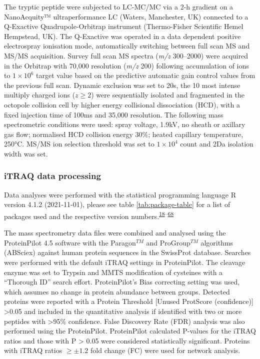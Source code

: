 \documentclass[
]{article}
\begin{document}
The tryptic peptide were subjected to LC-MC/MC via a 2-h gradient on a NanoAcquity™ ultraperformance LC (Waters, Manchester, UK) connected to a Q-Exactive Quadrupole-Orbitrap instrument (Thermo-Fisher Scientific Hemel Hempstead, UK).
The Q-Exactive was operated in a data dependent positive electrospray ionisation mode, automatically switching between full scan MS and MS/MS acquisition.
Survey full scan MS spectra (\emph{m/z} 300--2000) were acquired in the Orbitrap with 70,000 resolution (\emph{m/z} 200) following accumulation of ions to \(1\times 10^6\) target value based on the predictive automatic gain control values from the previous full scan.
Dynamic exclusion was set to 20s, the 10 most intense multiply charged ions (\(z \geq 2\)) were sequentially isolated and fragmented in the octopole collision cell by higher energy collisional dissociation (HCD), with a fixed injection time of 100ms and 35,000 resolution.
The following mass spectrometric conditions were used: spray voltage, 1.9kV, no sheath or axillary gas flow; normalised HCD collision energy 30\%; heated capillary temperature, 250°C.
MS/MS ion selection threshold was set to \(1\times 10^4\) count and 2Da isolation width was set.

\hypertarget{itraq-stats}{%
\subsubsection{iTRAQ data processing}\label{itraq-stats}}

Data analyses were performed with the statistical programming language R version 4.1.2 (2021-11-01), please see table \ref{tab:package-table} for a list of packages used and the respective version numbers.\textsuperscript{\protect\hyperlink{ref-base}{18}--\protect\hyperlink{ref-zoo}{68}}

The mass spectrometry data files were combined and analysed using the ProteinPilot 4.5 software with the Paragon\(^{TM}\) and ProGroup\(^{TM}\) algorithms (ABSciex) against human protein sequences in the SwissProt database.
Searches were performed with the default iTRAQ settings in ProteinPilot.
The cleavage enzyme was set to Trypsin and MMTS modification of cysteines with a ``Thorough ID'' search effort.
ProteinPilot's Bias correcting setting was used, which assumes no change in protein abundance between groups.
Detected proteins were reported with a Protein Threshold {[}Unused ProtScore (confidence){]} \textgreater0.05 and included in the quantitative analysis if identified with two or more peptides with \textgreater95\% confidence.
False Discovery Rate (FDR) analysis was also performed using the ProteinPilot.
ProteinPilot calculated P-values for the iTRAQ ratios and those with P \textgreater{} 0.05 were considered statistically significant.
Proteins with iTRAQ ratios \(\ge\pm1.2\) fold change (FC) were used for network analysis.
\end{document}
